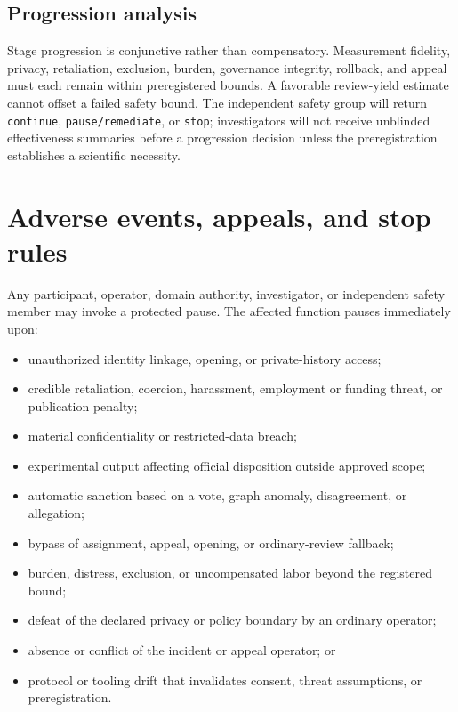 \documentclass[11pt]{article}
\begin{document}
\subsection{Progression analysis}

Stage progression is conjunctive rather than compensatory. Measurement fidelity,
privacy, retaliation, exclusion, burden, governance integrity, rollback, and appeal
must each remain within preregistered bounds. A favorable review-yield estimate
cannot offset a failed safety bound. The independent safety group will return
\texttt{continue}, \texttt{pause/remediate}, or \texttt{stop}; investigators will
not receive unblinded effectiveness summaries before a progression decision unless
the preregistration establishes a scientific necessity.

\section{Adverse events, appeals, and stop rules}

Any participant, operator, domain authority, investigator, or independent safety
member may invoke a protected pause. The affected function pauses immediately upon:

\begin{itemize}
  \item unauthorized identity linkage, opening, or private-history access;
  \item credible retaliation, coercion, harassment, employment or funding threat,
  or publication penalty;
  \item material confidentiality or restricted-data breach;
  \item experimental output affecting official disposition outside approved scope;
  \item automatic sanction based on a vote, graph anomaly, disagreement, or
  allegation;
  \item bypass of assignment, appeal, opening, or ordinary-review fallback;
  \item burden, distress, exclusion, or uncompensated labor beyond the registered
  bound;
  \item defeat of the declared privacy or policy boundary by an ordinary operator;
  \item absence or conflict of the incident or appeal operator; or
  \item protocol or tooling drift that invalidates consent, threat assumptions, or
  preregistration.
\end{itemize}
\end{document}
